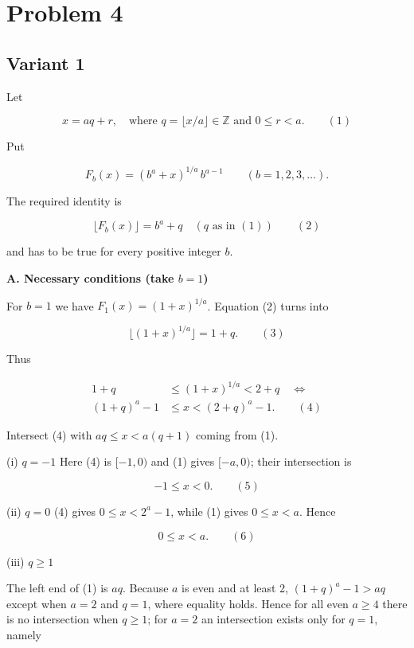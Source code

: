 \documentclass[12pt,a4paper]{article}
\theoremstyle{definition}
\begin{document}
    \section{Problem 4}
\subsection{Variant 1}
    Let

    $$x = aq + r, \quad \text{where } q = \lfloor x/a \rfloor \in \mathbb{Z} \text{ and } 0 \leq r < a. \qquad (1)$$

    Put

    $$F_b(x) = (b^a + x)^{1/a} \, b^{a-1} \qquad (b = 1,2,3,\ldots).$$

    The required identity is

    $$\lfloor F_b(x) \rfloor = b^a + q \quad (q \text{ as in } (1)) \qquad (2)$$

    and has to be true for every positive integer $b$.

    \textbf{A. Necessary conditions (take $b = 1$)}

    For $b = 1$ we have $F_1(x) = (1+x)^{1/a}$.
    Equation (2) turns into

    $$\lfloor (1+x)^{1/a} \rfloor = 1 + q. \qquad (3)$$

    Thus

    \begin{align}
        1+q &\leq (1+x)^{1/a} < 2+q \quad \Leftrightarrow \\
        (1+q)^a - 1 &\leq x < (2+q)^a - 1. \qquad (4)
    \end{align}

    Intersect (4) with $aq \leq x < a(q+1)$ coming from (1).

    (i) $q = -1$
    Here (4) is $[-1, 0)$ and (1) gives $[-a, 0)$; their intersection is

    $$-1 \leq x < 0. \qquad (5)$$

    (ii) $q = 0$
    (4) gives $0 \leq x < 2^a - 1$, while (1) gives $0 \leq x < a$.
    Hence

    $$0 \leq x < a. \qquad (6)$$

    (iii) $q \geq 1$

    The left end of (1) is $aq$.
    Because $a$ is even and at least 2,
    $(1+q)^a - 1 > aq$ except when $a = 2$ and $q = 1$, where equality holds.
    Hence for all even $a \geq 4$ there is no intersection when $q \geq 1$;
    for $a = 2$ an intersection exists only for $q = 1$, namely
\end{document}
